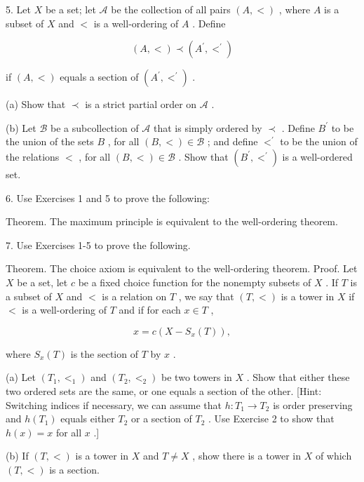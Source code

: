 5. Let \(X\) be a set; let \(\mathcal{A}\) be the collection of all pairs \(\left( {A, < }\right)\) , where \(A\) is a subset of \(X\) and \(<\) is a well-ordering of \(A\) . Define

\[
\left( {A, < }\right)  \prec  \left( {{A}^{\prime },{ < }^{\prime }}\right)
\]

if \(\left( {A, < }\right)\) equals a section of \(\left( {{A}^{\prime },{ < }^{\prime }}\right)\) .

(a) Show that \(\prec\) is a strict partial order on \(\mathcal{A}\) .

(b) Let \(\mathcal{B}\) be a subcollection of \(\mathcal{A}\) that is simply ordered by \(\prec\) . Define \({B}^{\prime }\) to be the union of the sets \(B\) , for all \(\left( {B, < }\right)  \in  \mathcal{B}\) ; and define \({ < }^{\prime }\) to be the union of the relations \(<\) , for all \(\left( {B, < }\right)  \in  \mathcal{B}\) . Show that \(\left( {{B}^{\prime },{ < }^{\prime }}\right)\) is a well-ordered set.

6. Use Exercises 1 and 5 to prove the following:

Theorem. The maximum principle is equivalent to the well-ordering theorem.

7. Use Exercises 1-5 to prove the following.

Theorem. The choice axiom is equivalent to the well-ordering theorem. Proof. Let \(X\) be a set, let \(c\) be a fixed choice function for the nonempty subsets of \(X\) . If \(T\) is a subset of \(X\) and \(<\) is a relation on \(T\) , we say that \(\left( {T, < }\right)\) is a tower in \(X\) if \(<\) is a well-ordering of \(T\) and if for each \(x \in  T\) ,

\[
x = c\left( {X - {S}_{x}\left( T\right) }\right) ,
\]

where \({S}_{x}\left( T\right)\) is the section of \(T\) by \(x\) .

(a) Let \(\left( {{T}_{1},{ < }_{1}}\right)\) and \(\left( {{T}_{2},{ < }_{2}}\right)\) be two towers in \(X\) . Show that either these two ordered sets are the same, or one equals a section of the other. [Hint: Switching indices if necessary, we can assume that \(h : {T}_{1} \rightarrow  {T}_{2}\) is order preserving and \(h\left( {T}_{1}\right)\) equals either \({T}_{2}\) or a section of \({T}_{2}\) . Use Exercise 2 to show that \(h\left( x\right)  = x\) for all \(x\) .]

(b) If \(\left( {T, < }\right)\) is a tower in \(X\) and \(T \neq  X\) , show there is a tower in \(X\) of which \(\left( {T, < }\right)\) is a section.

